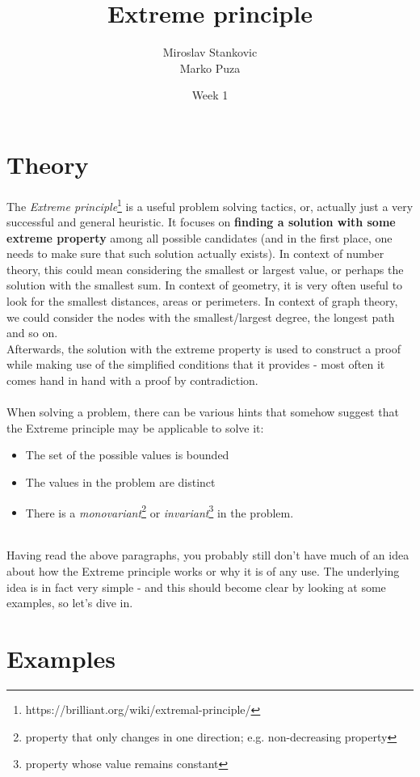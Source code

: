 \documentclass{article}
\title{\textbf{Extreme principle}}
\date{Week 1}
\author{Miroslav Stankovic\\ Marko Puza}
\begin{document}
\maketitle

\section{Theory}

The \emph{Extreme principle}\footnote{https://brilliant.org/wiki/extremal-principle/} is a useful problem solving tactics, or, actually just a very successful and general heuristic. It focuses on \textbf{finding a solution with some extreme property} among all possible candidates (and in the first place, one needs to make sure that such solution actually exists).
In context of number theory, this could mean considering the smallest or largest value, or perhaps the solution with the smallest sum. In context of geometry, it is very often useful to look for the smallest distances, areas or perimeters. In context of graph theory, we could consider the nodes with the smallest/largest degree, the longest path and so on.\\
Afterwards, the solution with the extreme property is used to construct a proof while making use of the simplified conditions that it provides - most often it comes hand in hand with a proof by contradiction.
\\\\
When solving a problem, there can be various hints that somehow suggest that the Extreme principle may be applicable to solve it:
\begin{itemize}
	\item{The set of the possible values is bounded}
	\item{The values in the problem are distinct}
	\item{There is a \emph{monovariant}\footnote{property that only changes in one direction; e.g. non-decreasing property} or \emph{invariant}\footnote{property whose value remains constant} in the problem.}
\end{itemize}


\noindent \\ Having read the above paragraphs, you probably still don't have much of an idea about how the Extreme principle works or why it is of any use. The underlying idea is in fact very simple - and this should become clear by looking at some examples, so let's dive in.

\section{Examples}
\end{document}
